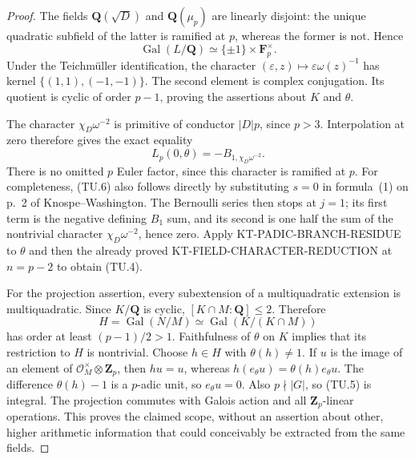 \begin{proof}
The fields $\mathbf Q(\sqrt D)$ and $\mathbf Q(\mu_p)$ are
linearly disjoint: the unique quadratic subfield of the latter
is ramified at $p$, whereas the former is not.  Hence
\[
 \operatorname{Gal}(L/\mathbf Q)
       \simeq\{\pm1\}\times\mathbf F_p^\times.
\]
Under the Teichm\"uller identification, the character
$(\varepsilon,z)\mapsto\varepsilon\omega(z)^{-1}$ has kernel
$\{(1,1),(-1,-1)\}$.  The second element is complex
conjugation.  Its quotient is cyclic of order $p-1$, proving
the assertions about $K$ and $\theta$.

The character $\chi_D\omega^{-2}$ is primitive of conductor
$|D|p$, since $p>3$.  Interpolation at zero therefore gives the
exact equality
\[
                     L_p(0,\theta)=-B_{1,\chi_D\omega^{-2}}.
                                                               \tag{TU.6}
\]
There is no omitted $p$ Euler factor, since this character is
ramified at $p$.  For completeness, (TU.6) also follows directly
by substituting $s=0$ in formula~(1) on p.~2 of
Knospe--Washington.  The Bernoulli series then stops at $j=1$;
its first term is the negative defining $B_1$ sum, and its
second is one half the sum of the nontrivial character
$\chi_D\omega^{-2}$, hence zero.
Apply KT-PADIC-BRANCH-RESIDUE to $\theta$ and then the already
proved KT-FIELD-CHARACTER-REDUCTION at $n=p-2$ to obtain (TU.4).

For the projection assertion, every subextension of a
multiquadratic extension is multiquadratic.  Since $K/\mathbf Q$
is cyclic, $[K\cap M:\mathbf Q]\le2$.  Therefore
\[
 H=\operatorname{Gal}(N/M)\simeq
       \operatorname{Gal}(K/(K\cap M))
\]
has order at least $(p-1)/2>1$.  Faithfulness of $\theta$ on
$K$ implies that its restriction to $H$ is nontrivial.  Choose
$h\in H$ with $\theta(h)\ne1$.  If $u$ is the image of an
element of $\mathcal O_M^\times\otimes\mathbf Z_p$, then
$hu=u$, whereas $h(e_\theta u)=\theta(h)e_\theta u$.
The difference $\theta(h)-1$ is a $p$-adic unit, so
$e_\theta u=0$.  Also $p\nmid|G|$, so (TU.5) is integral.
The projection commutes with Galois action and all
$\mathbf Z_p$-linear operations.  This proves the claimed
scope, without an assertion about other, higher arithmetic
information that could conceivably be extracted from the same
fields.
\end{proof}

